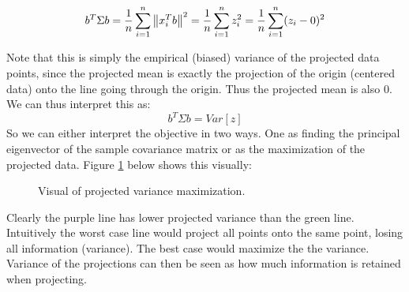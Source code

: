 \begin{equation}
b^T\Sigma b 
= \frac{1}{n}\sum_{i=1}^{n}\left\lVert x_i^Tb\right\rVert^2 
= \frac{1}{n}\sum_{i=1}^{n}z_i^2 
= \frac{1}{n}\sum_{i=1}^{n}(z_i - 0)^2
\end{equation}

Note that this is simply the empirical (biased) variance of
the projected data points, since the projected mean is 
exactly the projection of the origin (centered data) onto
the line going through the origin. Thus the projected mean
is also $0$. We can thus interpret this as:
\begin{equation}
	b^T\Sigma b = Var[z]
\end{equation}
So we can either interpret the objective in two ways.
One as finding the principal eigenvector of the sample 
covariance matrix or as the maximization of the projected
data. Figure \ref{fig:projected_variance} below shows this visually:
\begin{figure}[h!]
	\centering
	\caption{Visual of projected variance maximization.}
	\label{fig:projected_variance}
\end{figure}
Clearly the purple line has lower projected variance 
than the green line. Intuitively the worst case line 
would project all points onto the same point, losing 
all information (variance). The best case would 
maximize the the variance. Variance of the projections
can then be seen as how much information is retained 
when projecting.

